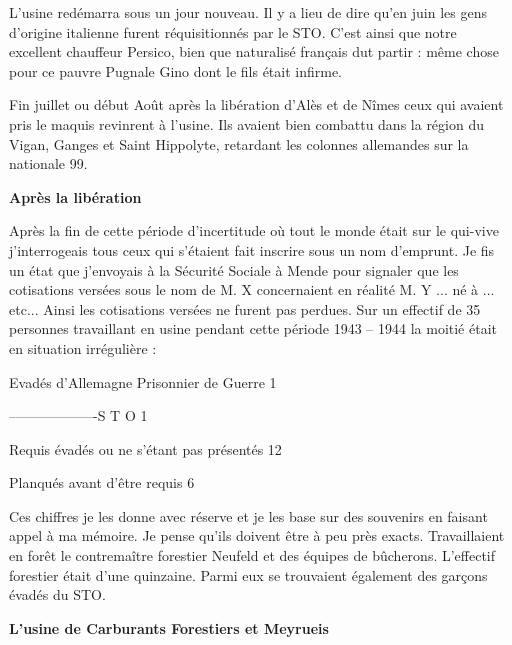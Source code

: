 L’usine redémarra sous un jour nouveau. Il y a lieu de dire qu’en juin les gens d’origine
italienne furent réquisitionnés par le STO. C’est ainsi que notre excellent chauffeur Persico,
bien que naturalisé français dut partir : même chose pour ce pauvre Pugnale Gino dont le fils
était infirme.

\vspace{0.45cm}

Fin juillet ou début Août après la libération d’Alès et de Nîmes ceux qui avaient pris le
maquis revinrent à l’usine. Ils avaient bien combattu dans la région du Vigan, Ganges et Saint
Hippolyte, retardant les colonnes allemandes sur la nationale 99.

\vspace{0.55cm}

\textbf{Après la libération}

\vspace{0.35cm}

Après la fin de cette période d’incertitude où tout le monde était sur le qui-vive j’interrogeais
tous ceux qui s’étaient fait inscrire sous un nom d’emprunt. Je fis un état que j’envoyais à la
Sécurité Sociale à Mende pour signaler que les cotisations versées sous le nom de M. X
concernaient en réalité M. Y ... né à ... etc... Ainsi les cotisations versées ne furent pas
perdues. Sur un effectif de 35 personnes travaillant en usine pendant cette période 1943 –
1944 la moitié était en situation irrégulière :

\vspace{0.25cm}

Evadés d’Allemagne Prisonnier de Guerre \hfill 1

-------------------S T O \hfill 1

Requis évadés ou ne s’étant pas présentés \hfill 12

Planqués avant d’être requis \hfill 6

\vspace{0.4cm}

Ces chiffres je les donne avec réserve et je les base sur des souvenirs en faisant appel à ma
mémoire. Je pense qu’ils doivent être à peu près exacts.
Travaillaient en forêt le contremaître forestier Neufeld et des équipes de bûcherons. L’effectif
forestier était d’une quinzaine. Parmi eux se trouvaient également des garçons évadés du
STO.

\vspace{0.55cm}

\textbf{L’usine de Carburants Forestiers et Meyrueis}

